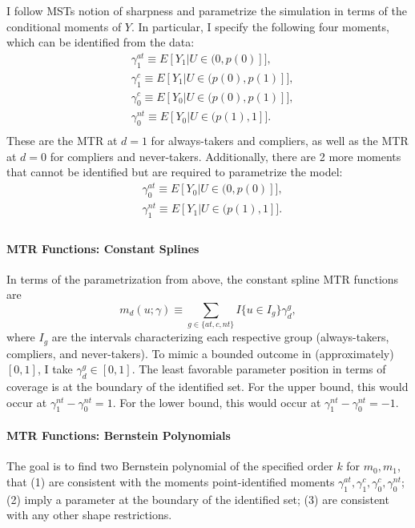 \documentclass[12pt,a4paper,english]{article} %
\numberwithin{equation}{section}
\theoremstyle{definition}
\theoremstyle{remark}
\theoremstyle{plain}
\begin{document}
I follow MSTs notion of sharpness and parametrize the simulation in terms of the conditional moments of $Y$.
In particular, I specify the following four moments, which can be identified from the data:
\begin{align*}
  & \gamma_1^{at} \equiv E[Y_1| U \in (0, p(0)]], \\
  & \gamma_1^{c} \equiv E[Y_1| U \in (p(0), p(1)]], \\
  & \gamma_0^{c} \equiv E[Y_0| U \in (p(0), p(1)]], \\
  & \gamma_0^{nt} \equiv E[Y_0| U \in (p(1), 1]]. \\
\end{align*}
These are the MTR at $d=1$ for always-takers and compliers, as well as the MTR at $d=0$ for compliers and never-takers.
Additionally, there are 2 more moments that cannot be identified but are required to parametrize the model:
\begin{align*}
  & \gamma_0^{at} \equiv E[Y_0| U \in (0, p(0)]], \\
  & \gamma_1^{nt} \equiv E[Y_1| U \in (p(1), 1]]. \\
\end{align*}


\paragraph{MTR Functions: Constant Splines}
In terms of the parametrization from above, the constant spline MTR functions are
\begin{equation*}
  m_d(u; \gamma) \equiv \sum_{g\in\{at, c, nt\}} I\{u \in I_g\} \gamma_{d}^g,
\end{equation*}
where $I_g$ are the intervals characterizing each respective group (always-takers, compliers, and never-takers).
To mimic a bounded outcome in (approximately) $[0,1]$, I take $\gamma_d^g\in[0,1]$.
The least favorable parameter position in terms of coverage is at the boundary of the identified set.
For the upper bound, this would occur at $\gamma_1^{nt} - \gamma_0^{nt} = 1$.
For the lower bound, this would occur at $\gamma_1^{nt} - \gamma_0^{nt} = -1$.

\paragraph{MTR Functions: Bernstein Polynomials}
The goal is to find two Bernstein polynomial of the specified order $k$ for $m_0, m_1$, that
(1) are consistent with the moments point-identified moments $\gamma_1^{at}, \gamma_1^c, \gamma_0^c, \gamma_0^{nt}$;
(2) imply a parameter at the boundary of the identified set;
(3) are consistent with any other shape restrictions.
\end{document}
